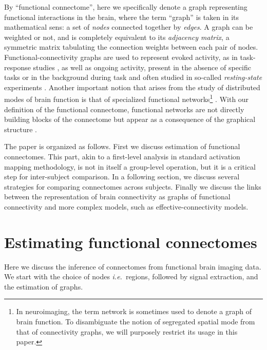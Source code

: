 \documentclass[5p]{elsarticle}
\begin{document}
By ``functional connectome'', here we specifically denote a graph
representing functional interactions in the brain, where the term
``graph'' is taken in its mathematical sens: a set of \emph{nodes}
connected together by \emph{edges}. A graph can be weighted or not, and
is completely equivalent to its \emph{adjacency matrix}, a symmetric
matrix tabulating the connection weights between each pair of nodes.
Functional-connectivity graphs are used to represent evoked activity,
as in task-response studies \cite{mcintosh2000}, as well as
ongoing activity, present in the absence of specific tasks or in 
the background during task and often studied in so-called \emph{resting-state}
experiments \cite{raichle2010}. Another important notion that arises from
the study of distributed modes of brain function is that of specialized
functional networks\footnote{In neuroimaging, the term network is
sometimes used to denote a graph of brain function. To disambiguate the
notion of segregated spatial mode \cite{fox2005} from that of
connectivity graphs, we will purposely restrict its usage in this
paper.} \cite{fox2005}. With our definition of the functional connectome, functional
networks are not directly building blocks of the connectome but appear
as a consequence of the graphical structure
\cite{varoquaux2010c,varoquaux2012}.

The paper is organized as follows. First we discuss estimation of
functional connectomes. This part, akin to a first-level analysis in
standard activation mapping methodology, is not in itself a group-level
operation, but it is a critical step for inter-subject comparison.
In a following section, we discuss several strategies for comparing
connectomes across subjects. Finally we discuss the links between the
representation of brain connectivity as graphs of functional connectivity
and more complex models, such as effective-connectivity models.



\section{Estimating functional connectomes}

Here we discuss the inference of connectomes from functional brain
imaging data. We start with the choice of nodes \emph{i.e.}\ regions,
followed by signal extraction, and the estimation of graphs.
\end{document}
